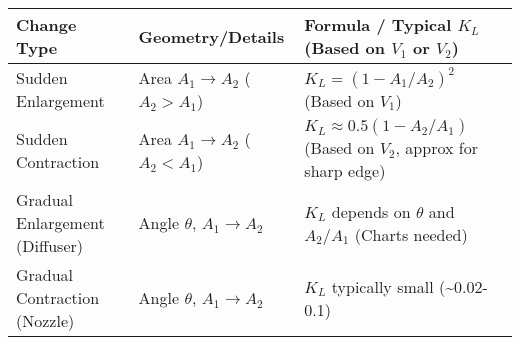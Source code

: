 \begin{longtable}[]{@{}lll@{}}
\toprule
\begin{minipage}[b]{0.19\columnwidth}\raggedright
Change Type\strut
\end{minipage} & \begin{minipage}[b]{0.26\columnwidth}\raggedright
Geometry/Details\strut
\end{minipage} & \begin{minipage}[b]{0.46\columnwidth}\raggedright
Formula / Typical \(K_L\) (Based on \(V_1\) or \(V_2\))\strut
\end{minipage}\tabularnewline
\midrule
\endhead
\begin{minipage}[t]{0.19\columnwidth}\raggedright
Sudden Enlargement\strut
\end{minipage} & \begin{minipage}[t]{0.26\columnwidth}\raggedright
Area \(A_1 \to A_2\) (\(A_2>A_1\))\strut
\end{minipage} & \begin{minipage}[t]{0.46\columnwidth}\raggedright
\(K_L = (1 - A_1/A_2)^2\) (Based on \(V_1\))\strut
\end{minipage}\tabularnewline
\begin{minipage}[t]{0.19\columnwidth}\raggedright
Sudden Contraction\strut
\end{minipage} & \begin{minipage}[t]{0.26\columnwidth}\raggedright
Area \(A_1 \to A_2\) (\(A_2<A_1\))\strut
\end{minipage} & \begin{minipage}[t]{0.46\columnwidth}\raggedright
\(K_L \approx 0.5(1 - A_2/A_1)\) (Based on \(V_2\), approx for sharp
edge)\strut
\end{minipage}\tabularnewline
\begin{minipage}[t]{0.19\columnwidth}\raggedright
Gradual Enlargement (Diffuser)\strut
\end{minipage} & \begin{minipage}[t]{0.26\columnwidth}\raggedright
Angle \(\theta\), \(A_1 \to A_2\)\strut
\end{minipage} & \begin{minipage}[t]{0.46\columnwidth}\raggedright
\(K_L\) depends on \(\theta\) and \(A_2/A_1\) (Charts needed)\strut
\end{minipage}\tabularnewline
\begin{minipage}[t]{0.19\columnwidth}\raggedright
Gradual Contraction (Nozzle)\strut
\end{minipage} & \begin{minipage}[t]{0.26\columnwidth}\raggedright
Angle \(\theta\), \(A_1 \to A_2\)\strut
\end{minipage} & \begin{minipage}[t]{0.46\columnwidth}\raggedright
\(K_L\) typically small (\textasciitilde0.02-0.1)\strut
\end{minipage}\tabularnewline
\bottomrule
\end{longtable}

